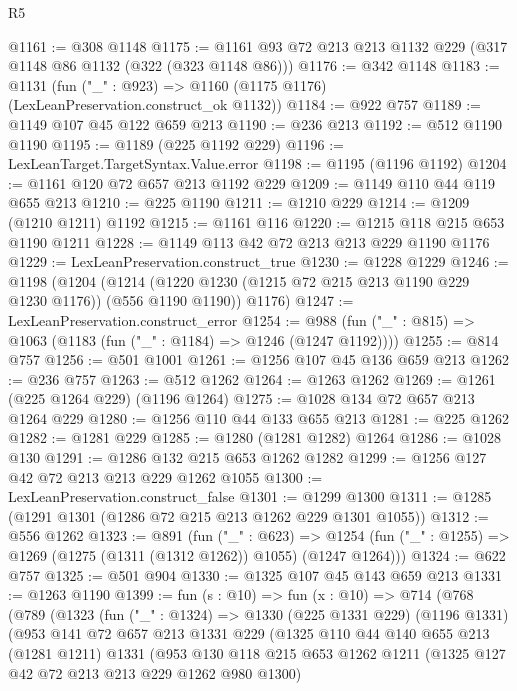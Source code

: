 \begin{lexlean}{R5}
\begin{coremodule}
{{{{{{{{{{{{{@1161 := @308 @1148
@1175 := @1161 @93 @72 @213 @213 @1132 @229 (@317 @1148 @86 @1132 (@322 (@323 @1148 @86)))
@1176 := @342 @1148
@1183 := @1131 (fun ("_" : @923) => @1160 (@1175 @1176) (LexLeanPreservation.construct_ok @1132))
@1184 := @922 @757
@1189 := @1149 @107 @45 @122 @659 @213
@1190 := @236 @213
@1192 := @512 @1190 @1190
@1195 := @1189 (@225 @1192 @229)
@1196 := LexLeanTarget.TargetSyntax.Value.error
@1198 := @1195 (@1196 @1192)
@1204 := @1161 @120 @72 @657 @213 @1192 @229
@1209 := @1149 @110 @44 @119 @655 @213
@1210 := @225 @1190
@1211 := @1210 @229
@1214 := @1209 (@1210 @1211) @1192
@1215 := @1161 @116
@1220 := @1215 @118 @215 @653 @1190 @1211
@1228 := @1149 @113 @42 @72 @213 @213 @229 @1190 @1176
@1229 := LexLeanPreservation.construct_true
@1230 := @1228 @1229
@1246 := @1198
    (@1204
      (@1214 (@1220 @1230 (@1215 @72 @215 @213 @1190 @229 @1230 @1176)) (@556 @1190 @1190))
      @1176)
@1247 := LexLeanPreservation.construct_error
@1254 := @988 (fun ("_" : @815) => @1063 (@1183 (fun ("_" : @1184) => @1246 (@1247 @1192))))
@1255 := @814 @757
@1256 := @501 @1001
@1261 := @1256 @107 @45 @136 @659 @213
@1262 := @236 @757
@1263 := @512 @1262
@1264 := @1263 @1262
@1269 := @1261 (@225 @1264 @229) (@1196 @1264)
@1275 := @1028 @134 @72 @657 @213 @1264 @229
@1280 := @1256 @110 @44 @133 @655 @213
@1281 := @225 @1262
@1282 := @1281 @229
@1285 := @1280 (@1281 @1282) @1264
@1286 := @1028 @130
@1291 := @1286 @132 @215 @653 @1262 @1282
@1299 := @1256 @127 @42 @72 @213 @213 @229 @1262 @1055
@1300 := LexLeanPreservation.construct_false
@1301 := @1299 @1300
@1311 := @1285 (@1291 @1301 (@1286 @72 @215 @213 @1262 @229 @1301 @1055))
@1312 := @556 @1262
@1323 := @891
    (fun ("_" : @623) =>
    @1254 (fun ("_" : @1255) => @1269 (@1275 (@1311 (@1312 @1262)) @1055) (@1247 @1264)))
@1324 := @622 @757
@1325 := @501 @904
@1330 := @1325 @107 @45 @143 @659 @213
@1331 := @1263 @1190
@1399 := fun (s : @10) =>
  fun (x : @10) =>
  @714
    (@768
      (@789
        (@1323
          (fun ("_" : @1324) =>
          @1330
            (@225 @1331 @229)
            (@1196 @1331)
            (@953
              @141
              @72
              @657
              @213
              @1331
              @229
              (@1325
                @110
                @44
                @140
                @655
                @213
                (@1281 @1211)
                @1331
                (@953
                  @130
                  @118
                  @215
                  @653
                  @1262
                  @1211
                  (@1325 @127 @42 @72 @213 @213 @229 @1262 @980 @1300)
}}}}}}}}}}}}}
\end{coremodule}
\end{lexlean}
